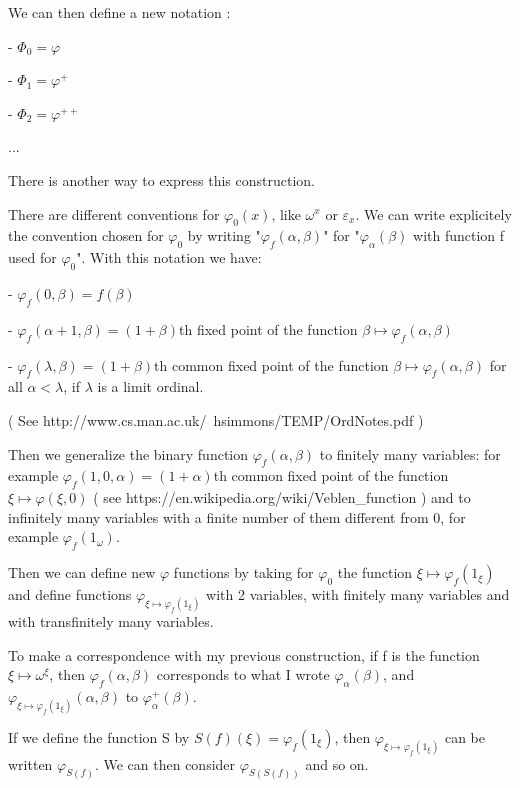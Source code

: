 \documentclass[10pt]{article}
\begin{document}
We can then define a new notation : 

 - \( \Phi_0 = \varphi \)
 
 - \( \Phi_1 = \varphi^+ \)

 - \( \Phi_2 = \varphi^{++} \)

 ...

\bigskip

There is another way to express this construction.

There are different conventions for \( \varphi_0(x) \), like \( \omega^x \) or \( \varepsilon_x \). We can write explicitely the convention chosen for \( \varphi_0 \) by writing "\( \varphi_f(\alpha,\beta) \)" for "\( \varphi_\alpha(\beta) \) with function f used for \( \varphi_0 \)".  With this notation we have:

 - \( \varphi_f(0,\beta) = f(\beta) \)
 
 - \( \varphi_f(\alpha+1,\beta) = (1+\beta) \)th fixed point of the function \( \beta \mapsto \varphi_f(\alpha,\beta) \)
 
 - \( \varphi_f(\lambda,\beta) = (1+\beta) \)th common fixed point of the function \( \beta \mapsto \varphi_f(\alpha,\beta) \) for all \( \alpha < \lambda \), if \( \lambda \) is a limit ordinal.

( See http://www.cs.man.ac.uk/~hsimmons/TEMP/OrdNotes.pdf )

Then we generalize the binary function \( \varphi_f(\alpha,\beta) \) to finitely many variables: for example \( \varphi_f(1,0,\alpha) = (1+\alpha) \)th common fixed point of the function \( \xi \mapsto \varphi(\xi,0) \) ( see https://en.wikipedia.org/wiki/Veblen\_function ) and to infinitely many variables with a finite number of them different from 0, for example \( \varphi_f(1_\omega) \).

Then we can define new \( \varphi \) functions by taking for \( \varphi_0 \) the function \( \xi \mapsto \varphi_f(1_\xi) \) and define functions \( \varphi_{\xi \mapsto \varphi_f(1_\xi)} \) with 2 variables, with finitely many variables and with transfinitely many variables.

To make a correspondence with my previous construction, if f is the function \( \xi \mapsto \omega^\xi \), then \( \varphi_f(\alpha,\beta) \) corresponds to what I wrote \( \varphi_\alpha(\beta) \), and \( \varphi_{\xi \mapsto \varphi_f(1_\xi)}(\alpha,\beta) \) to \( \varphi^+_\alpha(\beta) \). 

If we define the function S by \( S(f)(\xi) = \varphi_f(1_\xi) \), then \( \varphi_{\xi \mapsto \varphi_f(1_\xi)}\) can be written \( \varphi_{S(f)} \). We can then consider \( \varphi_{S(S(f))} \) and so on.
\end{document}
